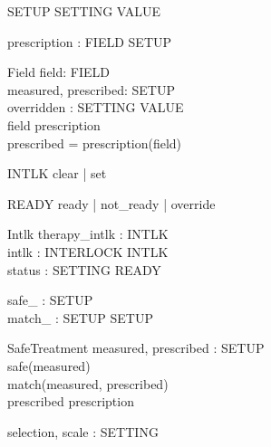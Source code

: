 
\begin{zed}
\end{zed}
\begin{zed}
SETUP  SETTING \fun VALUE
\end{zed}
\begin{axdef}
prescription : FIELD \pfun SETUP
\end{axdef}

\begin{schema}{Field}
field: FIELD \\
measured, prescribed: SETUP \\
overridden : SETTING \pfun VALUE \\
\ST field \in \dom prescription \\
prescribed = prescription(field)
\end{schema}

\begin{zed}
[INTERLOCK]
\end{zed}
\begin{zed}
INTLK \ddef clear | set
\end{zed}
\begin{zed}
READY \ddef ready | not\_ready | override
\end{zed}

\begin{schema}{Intlk}
therapy\_intlk : INTLK \\
intlk : INTERLOCK \fun INTLK \\
status : SETTING \fun READY
\end{schema}

\begin{axdef}
safe\_ : \power SETUP \\
match\_ : SETUP \rel SETUP
\end{axdef}

\begin{schema}{SafeTreatment}
measured, prescribed : SETUP \\
\ST safe(measured) \\
match(measured, prescribed) \\
prescribed \in \ran prescription
\end{schema}

\begin{axdef}
selection, scale : \power SETTING
\end{axdef}

